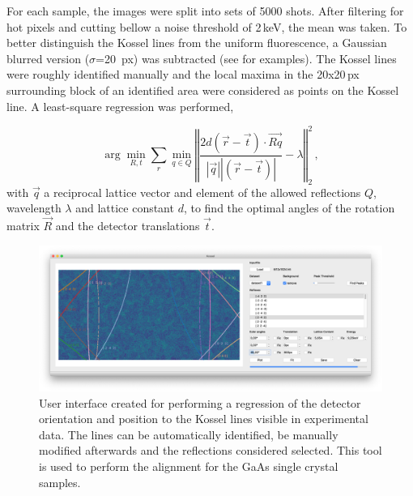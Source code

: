 For each sample, the images were split into sets of 5000 shots. After filtering for hot pixels and cutting bellow a noise threshold of 2\,keV, the mean was taken. To better distinguish the Kossel lines from the uniform fluorescence, a Gaussian blurred version ($\sigma$=20\, px) was subtracted (see  for examples). The Kossel lines were roughly identified manually and the local maxima in the 20x20\,px surrounding block of an identified area were considered as points on the Kossel line. A least-square regression was performed,

\begin{equation}
	\arg\!\min_{R,t} \sum_{r} \min_{q\in Q} \left\Vert \frac{2 d  \left( \vec{r} - \vec{t} \right) \cdot \vec{Rq}}{\left|\vec{q}\right| \left| \left(\vec{r}-\vec{t}\right)\right|} -\lambda \right\Vert_2^2 \,,
\end{equation}
with
$\vec{q}$ a reciprocal lattice vector and element of the allowed reflections $Q$, wavelength $\lambda$ and lattice constant $d$, to find
 the optimal angles of the rotation matrix $\vec{R}$ and the detector translations $\vec{t}$.
 


\begin{figure}
	\centering
	\includegraphics[width=0.8\linewidth]{images/kosselfit.png}
	\caption[User Interface for Kossel line based alignment]{User interface created for performing a regression of the detector orientation and position to the Kossel lines visible in experimental data. The lines can be automatically identified,  be  manually modified afterwards and the reflections considered selected. This tool is used to perform the alignment for the GaAs single crystal samples.}
	\label{fig:kosselfit}
\end{figure}





